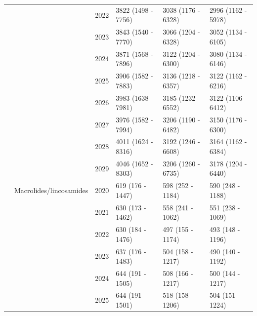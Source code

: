 \documentclass[
]{article}
\begin{document}
\begin{landscape}
\begin{longtable}[t]{llrlll}
\cmidrule{3-6}\nopagebreak
\hspace{1em} &  & 2022 & 3822 (1498 - 7756) & 3038 (1176 - 6328) & 2996 (1162 - 5978)\\
\cmidrule{3-6}\nopagebreak
\hspace{1em} &  & 2023 & 3843 (1540 - 7770) & 3066 (1204 - 6328) & 3052 (1134 - 6105)\\
\cmidrule{3-6}\nopagebreak
\hspace{1em} &  & 2024 & 3871 (1568 - 7896) & 3122 (1204 - 6300) & 3080 (1134 - 6146)\\
\cmidrule{3-6}\nopagebreak
\hspace{1em} &  & 2025 & 3906 (1582 - 7883) & 3136 (1218 - 6357) & 3122 (1162 - 6216)\\
\cmidrule{3-6}\nopagebreak
\hspace{1em} &  & 2026 & 3983 (1638 - 7981) & 3185 (1232 - 6552) & 3122 (1106 - 6412)\\
\cmidrule{3-6}\nopagebreak
\hspace{1em} &  & 2027 & 3976 (1582 - 7994) & 3206 (1190 - 6482) & 3150 (1176 - 6300)\\
\cmidrule{3-6}\nopagebreak
\hspace{1em} &  & 2028 & 4011 (1624 - 8316) & 3192 (1246 - 6608) & 3164 (1162 - 6384)\\
\cmidrule{3-6}\nopagebreak
\hspace{1em} &  & 2029 & 4046 (1652 - 8303) & 3206 (1260 - 6735) & 3178 (1204 - 6440)\\
\cmidrule{2-6}\nopagebreak
\hspace{1em} & Macrolides/lincosamides & 2020 & 619 (176 - 1447) & 598 (252 - 1184) & 590 (248 - 1188)\\
\cmidrule{3-6}\nopagebreak
\hspace{1em} &  & 2021 & 630 (173 - 1462) & 558 (241 - 1062) & 551 (238 - 1069)\\
\cmidrule{3-6}\nopagebreak
\hspace{1em} &  & 2022 & 630 (184 - 1476) & 497 (155 - 1174) & 493 (148 - 1196)\\
\cmidrule{3-6}\nopagebreak
\hspace{1em} &  & 2023 & 637 (176 - 1483) & 504 (158 - 1217) & 490 (140 - 1192)\\
\cmidrule{3-6}\nopagebreak
\hspace{1em} &  & 2024 & 644 (191 - 1505) & 508 (166 - 1217) & 500 (144 - 1217)\\
\cmidrule{3-6}\nopagebreak
\hspace{1em} &  & 2025 & 644 (191 - 1501) & 518 (158 - 1206) & 504 (151 - 1224)\\

\end{longtable}
\end{landscape}
\end{document}
